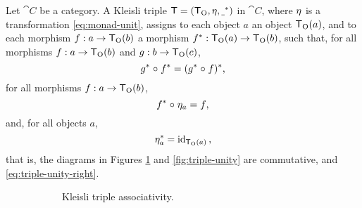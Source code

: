 \begin{definition}
  \label{def:triple}


  Let $\cat{C}$ be a category. A Kleisli triple $\mon{T} = (\funcO{T},
  \nat{\eta}, \monM{T}{\underscore})$ in $\cat{C}$, where $\nat{\eta}$
  is a transformation \eqref{eq:monad-unit}, assigns to each object
  $a$ an object $\funcO{T}(a)$, and to each morphism $f: a \to
  \funcO{T}(b)$ a morphism $\monM{T}{f}: \funcO{T}(a) \to
  \funcO{T}(b)$, such that, for all morphisms $f: a \to \funcO{T}(b)$
  and $g: b \to \funcO{T}(c)$,
  \begin{equation}
    \label{eq:triple-associativity}
    \monM{T}{g} \comp \monM{T}{f} = \monM{T}{(\monM{T}{g} \comp f)}
    \text{,}
  \end{equation}
  for all morphisms $f: a \to \funcO{T}(b)$,
  \begin{equation}
    \label{eq:triple-unity-left}
    \monM{T}{f} \comp \natO{\eta}{a} = f
    \text{,}
  \end{equation}
  and, for all objects $a$,
  \begin{equation}
    \label{eq:triple-unity-right}
    \monM{T}{\natO{\eta}{a}} = \idO{\funcO{T}(a)}
    \text{,}
  \end{equation}
  that is, the diagrams in Figures \ref{fig:triple-associativity} and
  \ref{fig:triple-unity} are commutative, and
  \eqref{eq:triple-unity-right}.

  \begin{figure}[htb]
    \begin{subfigure}[b]{0.45\linewidth}
      \begin{center}
      \end{center}
      \caption{Kleisli triple associativity.}
      \label{fig:triple-associativity}
    \end{subfigure}
    \begin{subfigure}[b]{0.45\linewidth}
      \begin{center}
\end{center}
\end{subfigure}
\end{figure}
\end{definition}
